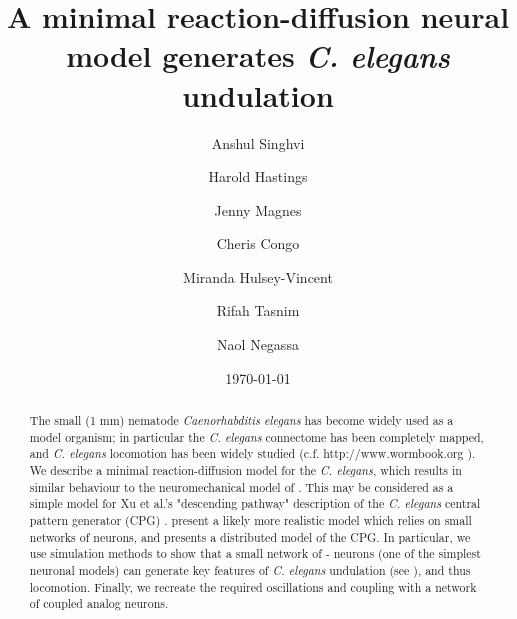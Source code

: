 \documentclass[
    11pt,
]{article}
\begin{document}


\title{A minimal reaction-diffusion neural model generates {\emph{C. elegans}} undulation}

\author[1]{Anshul Singhvi}

\author[1,3]{Harold Hastings}

\author[2]{Jenny Magnes}

\author[2]{Cheris Congo}

\author[2]{Miranda Hulsey-Vincent}

\author[1]{Rifah Tasnim}

\author[1]{Naol Negassa}


\date{\today}

\begin{abstract}
    The small (1 mm) nematode \emph{Caenorhabditis elegans} has become widely used as a model organism; in particular the \emph{C. elegans} connectome has been completely mapped, and \emph{C. elegans} locomotion has been widely studied (c.f. http://www.wormbook.org \citet{corsi2015}). We describe a minimal reaction-diffusion model for the \emph{C. elegans}, which results in similar behaviour to the neuromechanical model of \citet{izquierdo2018}. This  may be considered as a simple model for Xu et al.'s "descending pathway" description of the \emph{C. elegans} central pattern generator (CPG) \citet{xu2018,wen2012}. \citet{olivares2019} present a likely more realistic model which relies on small networks of neurons, and presents a distributed model of the CPG. In particular, we use simulation methods to show that a small network of \citet{fitzhugh1955}-\citet{nagumo1962} neurons (one of the simplest neuronal models) can generate key features of \emph{C. elegans} undulation (see \citet{magnes2012}), and thus locomotion.  Finally, we recreate the required oscillations and coupling with a network of coupled \citet{keener1983} analog neurons.
\end{abstract}

\maketitle
\end{document}
